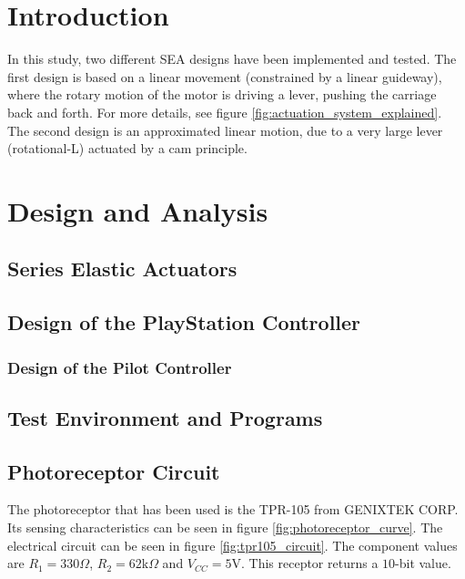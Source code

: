 	\section{Introduction}
	
	
In this study, two different SEA designs have been implemented and tested. The first design is based on a linear movement (constrained by a linear guideway), where the rotary motion of the motor is driving a lever, pushing the carriage back and forth. For more details, see figure \ref{fig:actuation_system_explained}. \\
The second design is an approximated linear motion, due to a very large lever (rotational-L) actuated by a cam principle.
	
	\section{Design and Analysis}
	\subsection{Series Elastic Actuators}
	
		
	\subsection{Design of the PlayStation Controller}
	
	
	
	\subsubsection{Design of the Pilot Controller}
	
	
	
	\subsection{Test Environment and Programs}
	
	
	
	\subsection{Photoreceptor Circuit}
	The photoreceptor that has been used is the TPR-105 from GENIXTEK CORP. Its sensing characteristics can be seen in figure \ref{fig:photoreceptor_curve}. The electrical circuit can be seen in figure \ref{fig:tpr105_circuit}. The component values are $R_1 = 330 \Omega$, $R_2 = 62$k$\Omega$ and $V_{CC} = 5$V. This receptor returns a $10$-bit value.
	
